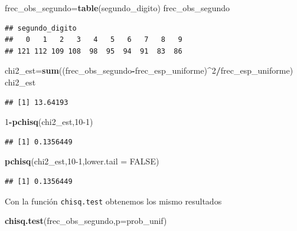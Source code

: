 \documentclass[
]{article}
\newenvironment{Shaded}{\begin{snugshade}}{\end{snugshade}}
\newcommand{\DataTypeTok}[1]{\textcolor[rgb]{0.13,0.29,0.53}{#1}}
\newcommand{\DecValTok}[1]{\textcolor[rgb]{0.00,0.00,0.81}{#1}}
\newcommand{\KeywordTok}[1]{\textcolor[rgb]{0.13,0.29,0.53}{\textbf{#1}}}
\newcommand{\NormalTok}[1]{#1}
\newcommand{\OperatorTok}[1]{\textcolor[rgb]{0.81,0.36,0.00}{\textbf{#1}}}
\newcommand{\OtherTok}[1]{\textcolor[rgb]{0.56,0.35,0.01}{#1}}
\begin{document}
\begin{Shaded}
\begin{Highlighting}[]
\NormalTok{frec\_obs\_segundo=}\KeywordTok{table}\NormalTok{(segundo\_digito)}
\NormalTok{frec\_obs\_segundo}
\end{Highlighting}
\end{Shaded}

\begin{verbatim}
## segundo_digito
##   0   1   2   3   4   5   6   7   8   9 
## 121 112 109 108  98  95  94  91  83  86
\end{verbatim}

\begin{Shaded}
\begin{Highlighting}[]
\NormalTok{chi2\_est=}\KeywordTok{sum}\NormalTok{((frec\_obs\_segundo}\OperatorTok{{-}}\NormalTok{frec\_esp\_uniforme)}\OperatorTok{\^{}}\DecValTok{2}\OperatorTok{/}\NormalTok{frec\_esp\_uniforme)}
\NormalTok{chi2\_est}
\end{Highlighting}
\end{Shaded}

\begin{verbatim}
## [1] 13.64193
\end{verbatim}

\begin{Shaded}
\begin{Highlighting}[]
\DecValTok{1}\OperatorTok{{-}}\KeywordTok{pchisq}\NormalTok{(chi2\_est,}\DecValTok{10{-}1}\NormalTok{)}
\end{Highlighting}
\end{Shaded}

\begin{verbatim}
## [1] 0.1356449
\end{verbatim}

\begin{Shaded}
\begin{Highlighting}[]
\KeywordTok{pchisq}\NormalTok{(chi2\_est,}\DecValTok{10{-}1}\NormalTok{,}\DataTypeTok{lower.tail =} \OtherTok{FALSE}\NormalTok{)}
\end{Highlighting}
\end{Shaded}

\begin{verbatim}
## [1] 0.1356449
\end{verbatim}

Con la función \texttt{chisq.test} obtenemos los mismo resultados

\begin{Shaded}
\begin{Highlighting}[]
\KeywordTok{chisq.test}\NormalTok{(frec\_obs\_segundo,}\DataTypeTok{p=}\NormalTok{prob\_unif)}
\end{Highlighting}
\end{Shaded}
\end{document}
